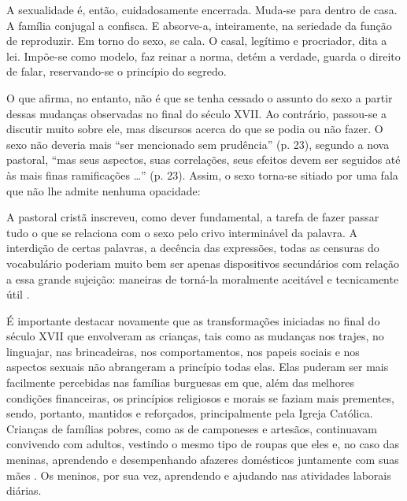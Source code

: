 \begin{citacao}
	A sexualidade é, então, cuidadosamente encerrada. Muda-se para dentro de casa. A família conjugal a confisca. E absorve-a, inteiramente, na seriedade da função de reproduzir. Em torno do sexo, se cala. O casal, legítimo e procriador, dita a lei. Impõe-se como modelo, faz reinar a norma, detém a verdade, guarda o direito de falar, reservando-se o princípio do segredo.
\end{citacao}

O que  afirma, no entanto, não é que se tenha cessado o assunto do sexo a partir dessas mudanças observadas no final do século XVII. Ao contrário, passou-se a discutir muito sobre ele, mas discursos acerca do que se podia ou não fazer. O sexo não deveria mais ``ser mencionado sem prudência'' (p. 23), segundo a nova pastoral, ``mas seus aspectos, suas correlações, seus efeitos devem ser seguidos até às mais finas ramificações \ldots'' (p. 23). Assim, o sexo torna-se sitiado por uma fala que não lhe admite nenhuma opacidade:

\begin{citacao}
	A pastoral cristã inscreveu, como dever fundamental, a tarefa de fazer passar tudo o que se relaciona com o sexo pelo crivo interminável da palavra. A interdição de certas palavras, a decência das expressões, todas as censuras do vocabulário poderiam muito bem ser apenas dispositivos secundários com relação a essa grande sujeição: maneiras de torná-la moralmente aceitável e tecnicamente útil \cite[p. 24]{FOUCAULT1988}.
\end{citacao}

É importante destacar novamente que as transformações iniciadas no final do século XVII que envolveram as crianças, tais como as mudanças nos trajes, no linguajar, nas brincadeiras, nos comportamentos, nos papeis sociais e nos aspectos sexuais não abrangeram a princípio todas elas. Elas puderam ser mais facilmente percebidas nas famílias burguesas em que, além das melhores condições financeiras, os princípios religiosos e morais se faziam mais prementes, sendo, portanto, mantidos e reforçados, principalmente pela Igreja Católica. Crianças de famílias pobres, como as de camponeses e artesãos, continuavam convivendo com adultos, vestindo o mesmo tipo de roupas que eles e, no caso das meninas, aprendendo e desempenhando afazeres domésticos juntamente com suas mães \cite{ARIES2011}. Os meninos, por sua vez, aprendendo e ajudando nas atividades laborais diárias.

